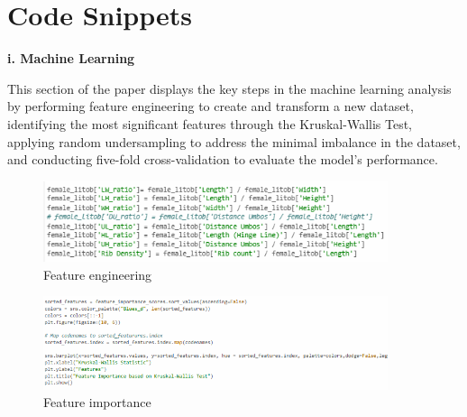 %
%
%                 

\chapter{Code Snippets}
\label{sec:appendixa}



%

\noindent\textbf{i. Machine Learning}
\vspace{-0.5cm}

This section of the paper displays the key steps in the machine learning analysis by performing feature engineering to create and transform a new dataset, identifying the most significant features through the Kruskal-Wallis Test, applying random undersampling to address the minimal imbalance in the dataset, and conducting five-fold cross-validation to evaluate the model's performance.


\begin{figure}[!htbp]
	\centering
	\includegraphics[width=0.9\textwidth, angle=0]{figures/feature_engineering.png}
	\caption{Feature engineering}
\end{figure}

\begin{figure}[!htbp]
	\centering
	\includegraphics[width=0.9\textwidth, angle=0]{figures/feature_importance.png}
	\caption{Feature importance}
\end{figure}

